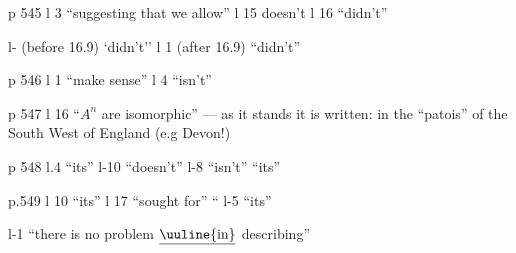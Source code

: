 p 545 l 3 ``suggesting that we allow'' \quad l 15 doesn't \quad l 16 ``didn't''

l- (before 16.9) `didn't'' \quad l 1 (after 16.9) ``didn't''

p 546 l 1 ``make sense'' \quad l 4 ``isn't''

p 547 l 16 ``$A^{n}$ are isomorphic'' --- as it stands it is written: in the ``patois'' of the South West of England (e.g Devon!)

p 548 l.4 ``its'' \quad l-10 ``doesn't'' \quad l-8 ``isn't'' ``its''

p.549 l 10 ``its'' \quad l 17 ``sought for'' \quad {} `` \quad l-5 ``its''

l-1 ``there is no problem $\underline{\text{\uuline{in}}}$ describing''
